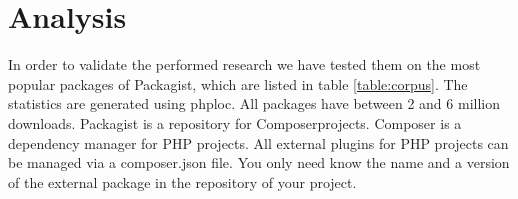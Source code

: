 \documentclass[../main.tex]{subfiles}
\begin{document}
    \chapter{Analysis}\label{ch:analysis}

       

In order to validate the performed research we have tested them on the most popular packages of Packagist\footnotemark, which are listed in table \ref{table:corpus}.
The statistics are generated using phploc\footnotemark.
All packages have between 2 and 6 million downloads.
Packagist is a repository for Composer\footnotemark projects.
Composer is a dependency manager for PHP projects.
All external plugins for PHP projects can be managed via a composer.json file.
You only need know the name and a version of the external package in the repository of your project.
\npaddmissingzero
\npfourdigitsep
\end{document}
